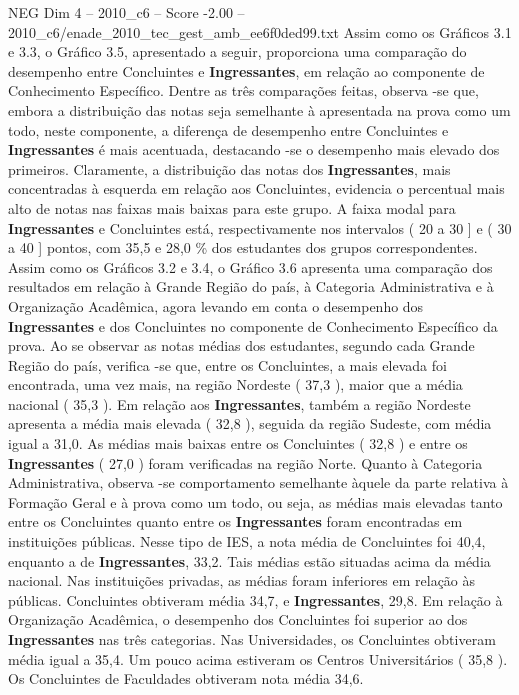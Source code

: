 \begin{textsample}{NEG Dim 4 – 2010\_c6 – Score -2.00 – 2010\_c6/enade\_2010\_tec\_gest\_amb\_ee6f0ded99.txt}
Assim como os Gráficos 3.1 e 3.3, o Gráfico 3.5, apresentado a seguir, proporciona uma comparação do desempenho entre Concluintes e \textbf{Ingressantes}, em relação ao componente de Conhecimento Específico.
Dentre as três comparações feitas, observa -se que, embora a distribuição das notas seja semelhante à apresentada na prova como um todo, neste componente, a diferença de desempenho entre Concluintes e \textbf{Ingressantes} é mais acentuada, destacando -se o desempenho mais elevado dos primeiros.
Claramente, a distribuição das notas dos \textbf{Ingressantes}, mais concentradas à esquerda em relação aos Concluintes, evidencia o percentual mais alto de notas nas faixas mais baixas para este grupo.
A faixa modal para \textbf{Ingressantes} e Concluintes está, respectivamente nos intervalos ( 20 a 30 ] e ( 30 a 40 ] pontos, com 35,5 e 28,0 \% dos estudantes dos grupos correspondentes.
Assim como os Gráficos 3.2 e 3.4, o Gráfico 3.6 apresenta uma comparação dos resultados em relação à Grande Região do país, à Categoria Administrativa e à Organização Acadêmica, agora levando em conta o desempenho dos \textbf{Ingressantes} e dos Concluintes no componente de Conhecimento Específico da prova.
Ao se observar as notas médias dos estudantes, segundo cada Grande Região do país, verifica -se que, entre os Concluintes, a mais elevada foi encontrada, uma vez mais, na região Nordeste ( 37,3 ), maior que a média nacional ( 35,3 ).
Em relação aos \textbf{Ingressantes}, também a região Nordeste apresenta a média mais elevada ( 32,8 ), seguida da região Sudeste, com média igual a 31,0.
As médias mais baixas entre os Concluintes ( 32,8 ) e entre os \textbf{Ingressantes} ( 27,0 ) foram verificadas na região Norte.
Quanto à Categoria Administrativa, observa -se comportamento semelhante àquele da parte relativa à Formação Geral e à prova como um todo, ou seja, as médias mais elevadas tanto entre os Concluintes quanto entre os \textbf{Ingressantes} foram encontradas em instituições públicas.
Nesse tipo de IES, a nota média de Concluintes foi 40,4, enquanto a de \textbf{Ingressantes}, 33,2.
Tais médias estão situadas acima da média nacional.
Nas instituições privadas, as médias foram inferiores em relação às públicas.
Concluintes obtiveram média 34,7, e \textbf{Ingressantes}, 29,8.
Em relação à Organização Acadêmica, o desempenho dos Concluintes foi superior ao dos \textbf{Ingressantes} nas três categorias.
Nas Universidades, os Concluintes obtiveram média igual a 35,4.
Um pouco acima estiveram os Centros Universitários ( 35,8 ).
Os Concluintes de Faculdades obtiveram nota média 34,6.

\end{textsample}
